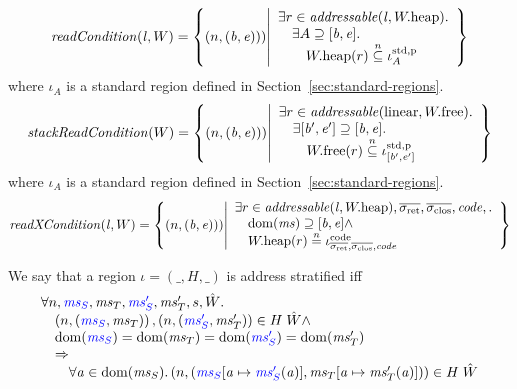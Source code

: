 \documentclass[a4paper]{article}
\begin{document}
\[
  \readCond{\lin,W} = \left\{ \npair{(\baddr,\eaddr})) \middle| 
    \begin{array}{l}
      \exists r \in \addressable{\lin, \pwheap} \ldotp \\
      \quad \exists A \supseteq [\baddr,\eaddr] \ldotp \\
      \qquad \pwheap(r) \nsubeq \stdreg{A}{\pur}
    \end{array}
  \right\}
\]
where $\iota_A$ is a standard region defined in Section~\ref{sec:standard-regions}.
\[
  \stackReadCond{W} = \left\{ \npair{(\baddr,\eaddr})) \middle| 
    \begin{array}{l}
      \exists r \in \addressable{\linear, \pwfree} \ldotp \\
      \quad \exists [\baddr',\eaddr'] \supseteq [\baddr,\eaddr] \ldotp \\
      \qquad \pwfree(r) \nsubeq \stdreg{[\baddr',\eaddr']}{\pur}
    \end{array}
  \right\}
\]
where $\iota_A$ is a standard region defined in Section~\ref{sec:standard-regions}.
\[
  \xReadCond{\lin,W} = \left\{ \npair{(\baddr,\eaddr})) \middle| 
    \begin{array}{l}
      \exists r \in \addressable{\lin, \pwheap}, \sigrets, \sigcloss, \code,  \ldotp\\
      \quad \dom(\ms) \supseteq [\baddr,\eaddr] \wedge \\
      \quad \pwheap(r) \nequal \codereg{\sigrets,\sigcloss,\code}
    \end{array}
  \right\}
\]

\begin{definition}
  \label{def:address-stratified}
  We say that a region $\iota = (\_,H,\_)$ is address stratified iff
  \[
    \begin{array}{l}
      \forall n, \src{\ms_S},\ms_T,\src{\ms_S'},\ms_T',s,\hat{W}\ldotp \\
      \quad \npair{\stpair{\ms}{\ms}}, \npair{\stpair[.]{\ms_S'}{\ms_T'}} \in H \; \hat{W} \wedge \\
      \quad \dom(\src{\ms_S}) = \dom(\ms_T) = \dom(\src{\ms_S'}) = \dom(\ms_T') \\
      \quad \Rightarrow \\
      \qquad \forall \aaddr \in \dom(\ms_S) \ldotp \npair{(\src{\ms_S}\update{\aaddr}{\src{\ms_S'}(\aaddr)},\ms_T\update{\aaddr}{\ms_T'(\aaddr)})} \in H \; \hat{W}
    \end{array}
  \]
\end{definition}
\end{document}
